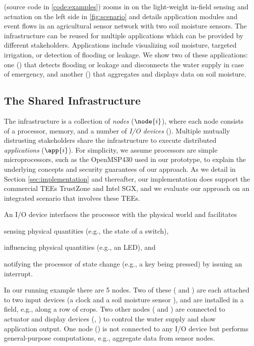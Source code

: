  (source code in \cref{code:examples}) zooms in on the
light-weight in-field sensing and actuation on the left side in
\cref{fig:scenario} and details application modules and event flows in an
agricultural sensor network with two soil moisture sensors. The infrastructure
can be reused for multiple applications which can be provided by different
stakeholders. Applications include visualizing soil moisture, targeted
irrigation, or detection of flooding or leakage. We show two of these
applications: one (\appvio) that detects flooding or leakage and disconnects the
water supply in case of emergency, and another (\appavl) that aggregates and
displays data on soil moisture.

\subsection{The Shared Infrastructure}
\label{concept:shared-infrastructure}
\label{concept:nodes}
%
The infrastructure is a collection of \emph{nodes} ($\node{i}$), where each node
consists of a processor, memory, and a number of \emph{I/O devices} ().
Multiple mutually distrusting stakeholders share the infrastructure to execute
distributed \emph{applications} ($\app{i}$). For simplicity, we assume
processors are simple microprocessors, such as the OpenMSP430 used in our
prototype, to explain the underlying concepts and security guarantees of our
approach. As we detail in Section \ref{sec:implementation} and thereafter, our
implementation does support the commercial \acp{TEE} TrustZone and Intel
\ac{SGX}, and we evaluate our approach on an integrated scenario that involves
these \acp{TEE}.
 
An I/O device interfaces the processor with the physical world and
facilitates
\begin{paraenum}
  \item sensing physical quantities (e.g., the state of a switch),
  \item influencing physical quantities (e.g., an LED), and
  \item notifying the processor of state change (e.g., a key being pressed) by
  issuing an interrupt.
\end{paraenum}

In our running example there are 5 nodes. Two of these ( and )
are each attached to two input devices (a clock  and a soil moisture
sensor ), and are installed in a field, e.g., along a row of crops. Two
other nodes ( and ) are connected to actuator and display
devices (, ) to control the water supply and show application
output. One node () is not connected to any I/O device but
performs general-purpose computations, e.g., aggregate data from sensor nodes.

